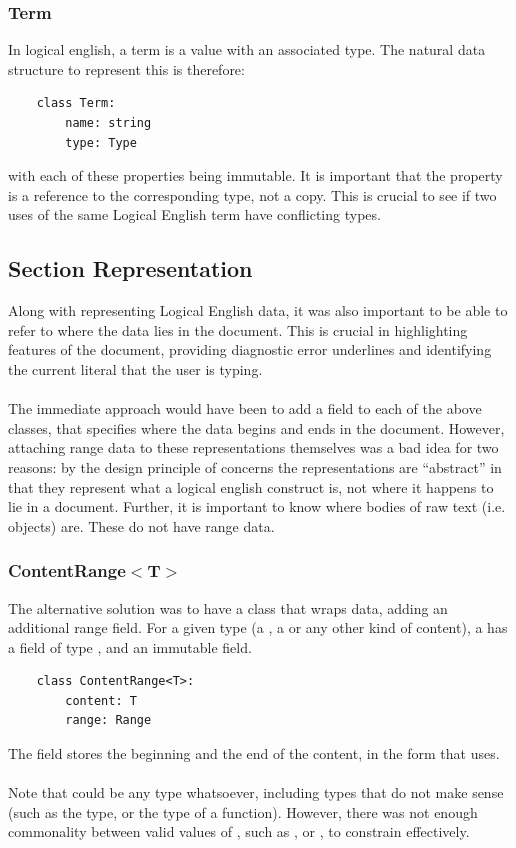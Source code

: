 \documentclass[../main.tex]{subfiles}
\begin{document}
\subsubsection{Term}
In logical english, a term is a value with an associated type. The natural data structure to represent this is therefore:
\begin{lstlisting}
    class Term:
        name: string
        type: Type
\end{lstlisting}
with each of these properties being immutable. It is important that the  property is a reference to the corresponding type, not a copy. This is crucial to see if two uses of the same Logical English term have conflicting types.

\subsection{Section Representation}
Along with representing Logical English data, it was also important to be able to refer to where the data lies in the document. This is crucial in highlighting features of the document, providing diagnostic error underlines and identifying the current literal that the user is typing. 
\\
\\
The immediate approach would have been to add a  field to each of the above classes, that specifies where the data begins and ends in the document. However, attaching range data to these representations themselves was a bad idea for two reasons: by the design principle of concerns  the representations are ``abstract'' in that they represent what a logical english construct is, not where it happens to lie in a document. Further, it is important to know where bodies of raw text (i.e.  objects) are. These do not have range data.

\subsubsection{ContentRange$<$T$>$}
The alternative solution was to have a class that wraps data, adding an additional range field. For a given type  (a , a  or any other kind of content), a  has a  field of type , and an immutable  field. 
\begin{lstlisting}
    class ContentRange<T>:
        content: T
        range: Range
\end{lstlisting}
The  field stores the beginning and the end of the content, in the  form that  uses. 
\\
\\
Note that  could be any type whatsoever, including types that do not make sense (such as the  type, or the type of a function). However, there was not enough commonality between valid values of , such as ,  or , to constrain  effectively.
%
%
%
\end{document}
